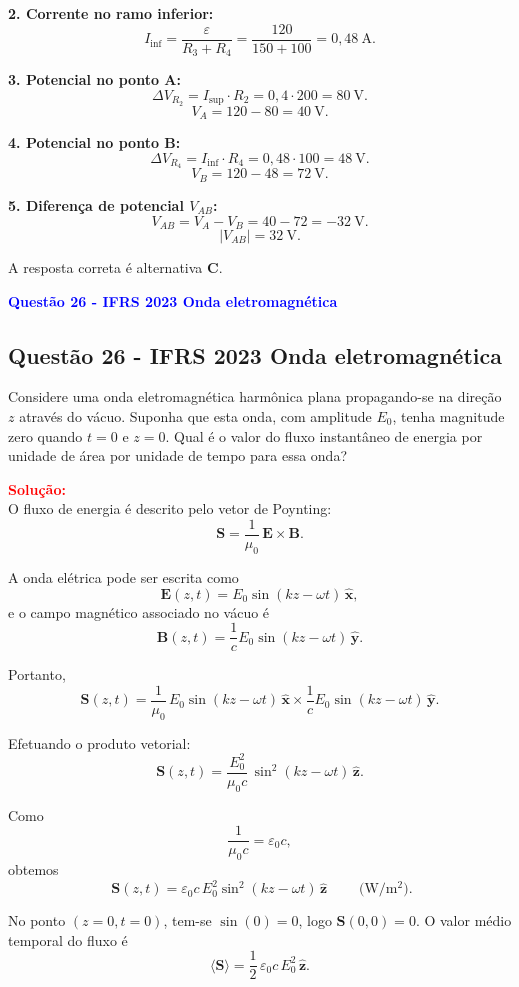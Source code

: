 \begin{flushleft}
\textbf{2. Corrente no ramo inferior:}
\[
I_{\text{inf}} = \frac{\varepsilon}{R_3 + R_4} = \frac{120}{150 + 100} = 0{,}48 \ \text{A}.
\]

\textbf{3. Potencial no ponto A:}
\[
\Delta V_{R_2} = I_{\text{sup}} \cdot R_2 = 0{,}4 \cdot 200 = 80 \ \text{V}.
\]
\[
V_A = 120 - 80 = 40 \ \text{V}.
\]

\textbf{4. Potencial no ponto B:}
\[
\Delta V_{R_4} = I_{\text{inf}} \cdot R_4 = 0{,}48 \cdot 100 = 48 \ \text{V}.
\]
\[
V_B = 120 - 48 = 72 \ \text{V}.
\]

\textbf{5. Diferença de potencial $V_{AB}$:}
\[
V_{AB} = V_A - V_B = 40 - 72 = -32 \ \text{V}.
\]
\[
|V_{AB}| = 32 \ \text{V}.
\]

A resposta correta é alternativa \colorbox{green!50}{\textbf{C}}.
\end{flushleft}

\begin{flushleft}
\textbf{\textcolor{blue}{\Large Quest\~ao 26 - IFRS 2023 Onda eletromagn\'etica}}\\
\noindent

\subsection{Quest\~ao 26 - IFRS 2023 Onda eletromagn\'etica}

Considere uma onda eletromagn\'etica harm\^onica plana propagando-se na dire\c{c}\~ao $z$
atrav\'es do v\'acuo. Suponha que esta onda, com amplitude $E_0$, tenha magnitude zero
quando $t=0$ e $z=0$. Qual \'e o valor do fluxo instant\^aneo de energia por unidade de 
\'area por unidade de tempo para essa onda?

\textcolor{red}{\textbf{Solução:}}\\

O fluxo de energia \'e descrito pelo vetor de Poynting:
\[
\mathbf{S} = \frac{1}{\mu_0}\,\mathbf{E} \times \mathbf{B}.
\]

A onda el\'etrica pode ser escrita como
\[
\mathbf{E}(z,t) = E_0 \sin(kz - \omega t)\,\hat{\mathbf{x}},
\]
e o campo magn\'etico associado no v\'acuo \'e
\[
\mathbf{B}(z,t) = \frac{1}{c} E_0 \sin(kz - \omega t)\,\hat{\mathbf{y}}.
\]

Portanto,
\[
\mathbf{S}(z,t) = \frac{1}{\mu_0}\,E_0 \sin(kz - \omega t)\,\hat{\mathbf{x}}
\times \frac{1}{c} E_0 \sin(kz - \omega t)\,\hat{\mathbf{y}}.
\]

Efetuando o produto vetorial:
\[
\mathbf{S}(z,t) = \frac{E_0^2}{\mu_0 c}\,\sin^2(kz - \omega t)\,\hat{\mathbf{z}}.
\]

Como
\[
\frac{1}{\mu_0 c} = \varepsilon_0 c,
\]
obtemos
\[
\boxed{\;\mathbf{S}(z,t) = \varepsilon_0 c\,E_0^2 \sin^2(kz - \omega t)\,\hat{\mathbf{z}}\;}
\qquad \text{(W/m$^2$)}.
\]

No ponto $(z=0,t=0)$, tem-se $\sin(0)=0$, logo $\mathbf{S}(0,0)=0$. O valor m\'edio temporal do fluxo \'e
\[
\langle \mathbf{S} \rangle = \frac{1}{2}\,\varepsilon_0 c\,E_0^2\,\hat{\mathbf{z}}.
\]

\end{flushleft}


